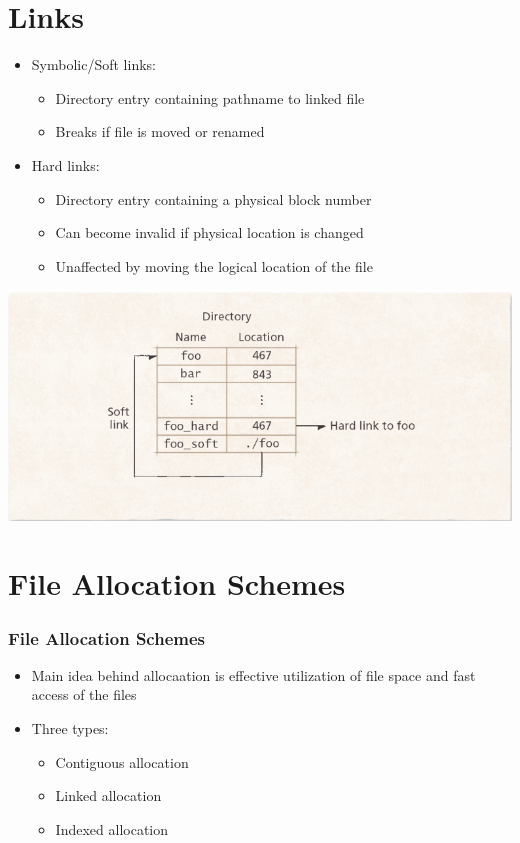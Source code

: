 \documentclass{beamer}
\begin{document}
\section{Links}
\begin{frame}
\begin{itemize}
\item Symbolic/Soft links:
\begin{itemize}
\item Directory entry containing pathname to linked file
\item Breaks if file is moved or renamed
\end{itemize}
\item Hard links:
\begin{itemize}
\item Directory entry containing a physical block number
\item Can become invalid if physical location is changed
\item Unaffected by moving the logical location of the file
\end{itemize}
\end{itemize}
\includegraphics[scale=0.35]{links.png}
\end{frame}
\section{File Allocation Schemes}
\begin{frame}
\frametitle{File Allocation Schemes}
\begin{itemize}
\item Main idea behind allocaation is effective utilization of file space and fast access of the files
\item Three types:
\begin{itemize}
\item Contiguous allocation
\item Linked allocation
\item Indexed allocation
\end{itemize}
\end{itemize}
\end{frame}
\end{document}
